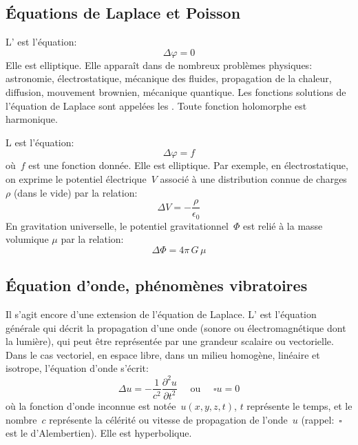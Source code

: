 \medskip
\subsection{Équations de Laplace et Poisson}
L' est l'équation:
\begin{equation}\Delta \varphi=0\end{equation}
Elle est elliptique. 
\medskipvm
Elle apparaît dans de nombreux problèmes physiques: astronomie, électrostatique, mécanique des fluides, propagation de la chaleur, diffusion, mouvement brownien, mécanique quantique.
\medskipvm
Les fonctions solutions de l'équation de Laplace sont appelées les . Toute fonction holomorphe est harmonique.

\medskip
L est l'équation:
\begin{equation}\Delta \varphi=f\end{equation}
où~$f$ est une fonction donnée. Elle est elliptique.
\medskipvm
Par exemple, en électrostatique, on exprime le potentiel électrique~$V$ associé à une distribution connue de charges~$\rho$ (dans le vide) par la relation:
\begin{equation}
  \Delta V = - \dfrac{\rho}{\epsilon_0}
\end{equation}
En gravitation universelle, le potentiel gravitationnel~$\Phi$ est relié à la masse volumique $\mu$ par la relation:
\begin{equation}
\Delta \Phi = 4 \pi \, G \, \mu 
\end{equation}

\medskip
\subsection{Équation d'onde, phénomènes vibratoires}\label{Sec-EqOnde}
Il s'agit encore d'une extension de l'équation de Laplace.
\medskipvm
L' est l'équation générale qui décrit la propagation d'une onde (sonore ou électromagnétique dont la lumière), qui peut être représentée par une grandeur scalaire ou vectorielle.
\medskipvm
Dans le cas vectoriel, en espace libre, dans un milieu homogène, linéaire et isotrope, l'équation d'onde s'écrit:
\begin{equation}
  \Delta u = - \frac1{c^2} \dfrac{\partial^2 u}{\partial t^2} \quad \text{ ou } \quad \square u =0
\end{equation}
où la fonction d'onde inconnue est notée~$u(x,y,z,t)$, $t$ représente le temps, et le nombre~$c$ représente la célérité ou vitesse de propagation de l'onde~$u$ (rappel:~$\square$ est le d'Alembertien). Elle est hyperbolique.


